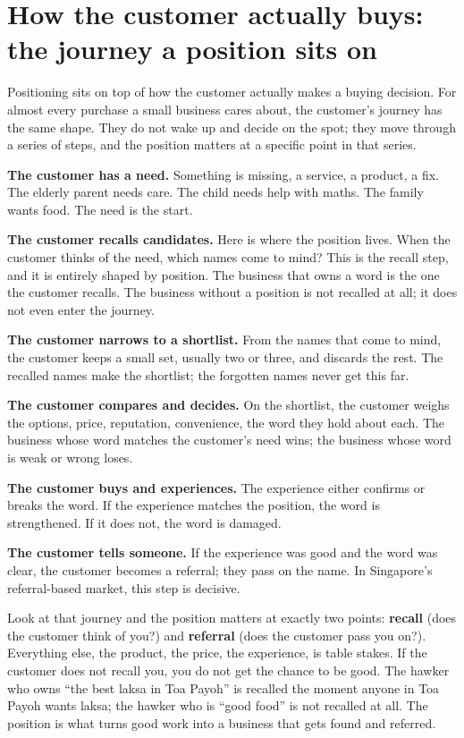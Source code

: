 \documentclass[10pt,twoside,openany]{memoir}
\newcommand{\needspacehead}{\needspace{4\baselineskip}}
\let\oldsection\section
\renewcommand{\section}{\needspacehead\oldsection}
\begin{document}
{\section{How the customer actually buys: the journey a position sits
on}\label{how-the-customer-actually-buys-the-journey-a-position-sits-on}

Positioning sits on top of how the customer actually makes a buying
decision. For almost every purchase a small business cares about, the
customer's journey has the same shape. They do not wake up and decide on
the spot; they move through a series of steps, and the position matters
at a specific point in that series.

\textbf{The customer has a need.} Something is missing, a service, a
product, a fix. The elderly parent needs care. The child needs help with
maths. The family wants food. The need is the start.

\textbf{The customer recalls candidates.} Here is where the position
lives. When the customer thinks of the need, which names come to mind?
This is the recall step, and it is entirely shaped by position. The
business that owns a word is the one the customer recalls. The business
without a position is not recalled at all; it does not even enter the
journey.

\textbf{The customer narrows to a shortlist.} From the names that come
to mind, the customer keeps a small set, usually two or three, and
discards the rest. The recalled names make the shortlist; the forgotten
names never get this far.

\textbf{The customer compares and decides.} On the shortlist, the
customer weighs the options, price, reputation, convenience, the word
they hold about each. The business whose word matches the customer's
need wins; the business whose word is weak or wrong loses.

\textbf{The customer buys and experiences.} The experience either
confirms or breaks the word. If the experience matches the position, the
word is strengthened. If it does not, the word is damaged.

\textbf{The customer tells someone.} If the experience was good and the
word was clear, the customer becomes a referral; they pass on the name.
In Singapore's referral-based market, this step is decisive.

Look at that journey and the position matters at exactly two points:
\textbf{recall} (does the customer think of you?) and \textbf{referral}
(does the customer pass you on?). Everything else, the product, the
price, the experience, is table stakes. If the customer does not recall
you, you do not get the chance to be good. The hawker who owns ``the
best laksa in Toa Payoh'' is recalled the moment anyone in Toa Payoh
wants laksa; the hawker who is ``good food'' is not recalled at all. The
position is what turns good work into a business that gets found and
referred.

}
\end{document}
